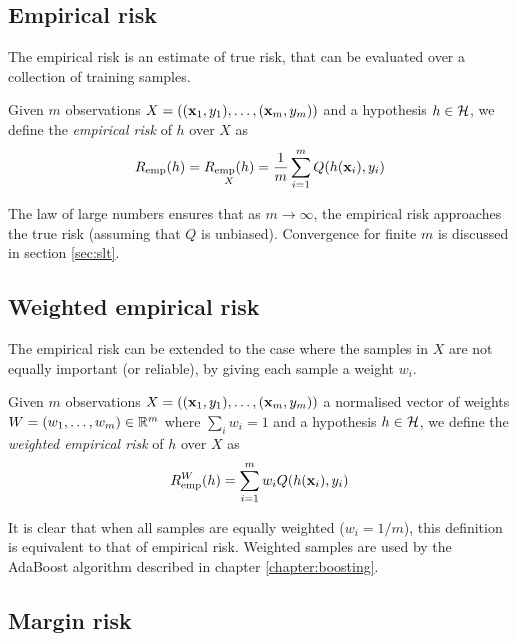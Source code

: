 \subsection{Empirical risk}
\label{sec:empirical risk}
The empirical risk is an estimate of true risk, that can be evaluated
over a collection of training samples.

\begin{definition}
Given $m$ observations $X = ((\mathbf{x}_1, y_1), \ldots, (\mathbf{x}_m, y_m))$
and a hypothesis $h \in \mathcal{H}$, we define the \emph{empirical risk} of
$h$ over $X$ as 
%
\begin{equation}
R_{\mathrm{emp}}(h) = \underset{X}{R_{\mathrm{emp}}(h)} = \frac{1}{m} \sum_{i=1}^{m}
Q(h(\mathbf{x}_i), y_i)
\end{equation}
\end{definition}

The law of large numbers ensures that as $m \rightarrow \infty$, the
empirical risk approaches the true risk (assuming that $Q$ is unbiased).
Convergence for finite $m$ is discussed in section \ref{sec:slt}.


\subsection{Weighted empirical risk}
\label{sec:weighted empirical risk}

The empirical risk can be extended to the case where the samples in
$X$ are not equally important (or reliable), by giving each sample a
weight $w_i$.

\begin{definition}
\label{def:weighted empirical risk}
Given $m$ observations $X = ((\mathbf{x}_1, y_1), \ldots, (\mathbf{x}_m,
y_m))$ a normalised vector of weights $W = (w_1, \ldots, w_m) \in
\mathbb{R}^m$ where $\sum_{i} w_i = 1$ and a hypothesis $h \in
\mathcal{H}$, we define the \emph{weighted empirical risk} of $h$ over $X$ as 
%
\begin{equation}
R_{\mathrm{emp}}^W(h) = \sum_{i=1}^{m} w_i Q(h(\mathbf{x}_i), y_i)
\end{equation}
\end{definition}
%
It is clear that when all samples are equally weighted ($w_i = 1/m$),
this definition is equivalent to that of empirical risk.  Weighted
samples are used by the AdaBoost algorithm described in chapter
\ref{chapter:boosting}.

\subsection{Margin risk}
\label{sec:margin risk}

